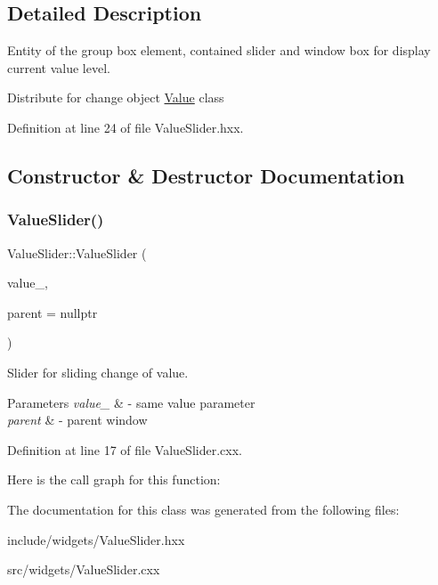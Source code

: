 \subsection{Detailed Description}
Entity of the group box element, contained slider and window box for display current value level. 

Distribute for change object \mbox{\hyperlink{classeven_1_1_value}{Value}} class 

Definition at line 24 of file Value\+Slider.\+hxx.



\subsection{Constructor \& Destructor Documentation}
\mbox{\label{classeven_1_1_value_slider_a69a3d2ff972e2fc0116709538b7e354f}} 
\subsubsection{\texorpdfstring{Value\+Slider()}{ValueSlider()}}
{\footnotesize\ttfamily Value\+Slider\+::\+Value\+Slider (\begin{DoxyParamCaption}\item[{Q\+Object $\ast$}]{value\+\_\+,  }\item[{Q\+Widget $\ast$}]{parent = {\ttfamily nullptr} }\end{DoxyParamCaption})}



Slider for sliding change of value. 


\begin{DoxyParams}{Parameters}
{\em value\+\_\+} & -\/ same value parameter \\
\hline
{\em parent} & -\/ parent window \\
\hline
\end{DoxyParams}


Definition at line 17 of file Value\+Slider.\+cxx.

Here is the call graph for this function\+:


The documentation for this class was generated from the following files\+:\begin{DoxyCompactItemize}
\item 
include/widgets/Value\+Slider.\+hxx\item 
src/widgets/Value\+Slider.\+cxx\end{DoxyCompactItemize}
